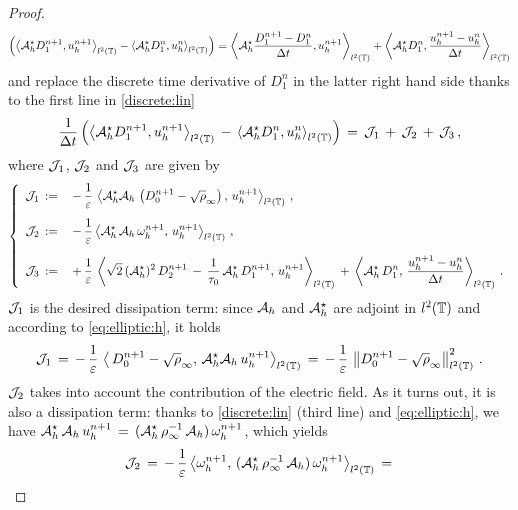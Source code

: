 \documentclass[11pt]{amsart}
\numberwithin{equation}{section}
\numberwithin{figure}{section}
\begin{document}
\begin{proof}
\[\left(
\left\langle
{\mathcal A}_h^\star D_1^{n+1}, u_h^{n+1}\right\rangle_{l^2\left({\mathbb T}\right)}
-
\left\langle
{\mathcal A}_h^\star D_1^n, u_h^n\right\rangle_{l^2\left({\mathbb T}\right)}
\right)=
\left\langle
{\mathcal A}_h^\star \frac{D^{n+1}_1- D^{n}_1}{\Delta t}, u_h^{n+1}\right\rangle_{l^2\left({\mathbb T}\right)}
+
\left\langle
{\mathcal A}_h^\star D_1^n, \frac{u^{n+1}_h- u^{n}_h}{\Delta t}\right\rangle_{l^2\left({\mathbb T}\right)}
\]
and replace the discrete time derivative of $D_1^n$ in the latter right hand side thanks to the first line in \eqref{discrete:lin}
	\begin{equation}\label{time:der:additional:term}
	\frac{1}{\Delta t}
	\left(
	\left\langle
	{\mathcal A}_h^\star D_1^{n+1}, u_h^{n+1}\right\rangle_{l^2\left({\mathbb T}\right)}
	\,-\,
	\left\langle
	{\mathcal A}_h^\star D_1^n, u_h^n\right\rangle_{l^2\left({\mathbb T}\right)}
	\right)
	\,=\,
	{\mathcal J}_1
	\,+\,
	{\mathcal J}_2
	\,+\,{\mathcal J}_3\,,
	\end{equation}
	where ${\mathcal J}_1$, ${\mathcal J}_2$ and ${\mathcal J}_3$ are given by
	$$
	\left\{\begin{array}{ll}
		\displaystyle{\mathcal J}_1\,:=\,
		&\displaystyle-\,\frac{1}{\varepsilon}\,\left\langle{\mathcal A}_h^\star{\mathcal A}_h\,\left(D^{n+1}_0-\sqrt\rho_{\infty}\right) 
		,\, u_h^{n+1}\right\rangle_{l^2\left({\mathbb T}\right)}\,,\\[1.2em]
		\displaystyle {\mathcal J}_2\,:=\,&\displaystyle -\,\frac{1}{\varepsilon}\left\langle {\mathcal A}_h^\star
		\, {\mathcal A}_h
		\, \omega^{n+1}_h,\,u^{n+1}_h\right\rangle_{l^2\left({\mathbb T}\right)}
		\,,
		\\[1.3em]
		\displaystyle{\mathcal J}_3\,:=\,&\displaystyle
		+\,\frac{1}{\varepsilon}\,\left\langle
		\sqrt{2}\,({\mathcal A}_h^\star)^2\, D_2^{n+1}
		\,-\,\frac{1}{\tau_0}\,{\mathcal A}_h^\star\, D^{n+1}_1
		,\, u_h^{n+1}\right\rangle_{l^2\left({\mathbb T}\right)}
		\,+\,
		\left\langle {\mathcal A}_h^\star
		\, D^{n}_1,\,\frac{u^{n+1}_h- u^{n}_h}{\Delta t}\right\rangle_{l^2\left({\mathbb T}\right)}
		\,.
	\end{array}\right.
	$$
${\mathcal J}_1$ is the desired dissipation term: since ${\mathcal A}_h$ and ${\mathcal A}^\star_h$ are adjoint in $l^2({\mathbb T})$ and according to \eqref{eq:elliptic:h}, it holds
	\[
	{\mathcal J}_1\,=\,
	-\,\frac{1}{\varepsilon}\,\left\langle\,D^{n+1}_0-\sqrt\rho_{\infty}
	,\, {\mathcal A}_h^\star{\mathcal A}_h\, u_h^{n+1}\right\rangle_{l^2\left({\mathbb T}\right)}
	\,=\,
	-\,\frac{1}{\varepsilon}\,\left\|D^{n+1}_0-\sqrt\rho_{\infty}\right\|_{l^2\left({\mathbb T}\right)}^2\,.
	\] 
	${\mathcal J}_2$ takes into account the contribution of the electric field. As it turns out, it is also a dissipation term: thanks to \eqref{discrete:lin} (third line) and \eqref{eq:elliptic:h}, we have
	$\displaystyle
	{\mathcal A}_h^\star\,{\mathcal A}_h \,u_h^{n+1}\,=\,({\mathcal A}_h^\star\,\rho_{\infty}^{-1}\,{\mathcal A}_h) \,\omega_h^{n+1}
	$, which yields
	\[
	{\mathcal J}_2\,=\, -\,\frac{1}{\varepsilon}\left\langle
	 \omega^{n+1}_h,\,({\mathcal A}_h^\star\,\rho_{\infty}^{-1}\,{\mathcal A}_h) \,\omega_h^{n+1}\right\rangle_{l^2\left({\mathbb T}\right)}\,=\,
\]
\end{proof}
\end{document}
